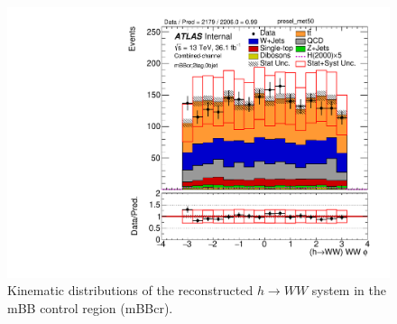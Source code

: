 \begin{figure}[!h]
\begin{center}
\includegraphics[scale=0.33]{./figures/boosted/PlotsInMbbCR/DataMC_2tag_0bjet_mbbcr_lepton_presel_met50_WWPhi}
\caption{Kinematic distributions of the reconstructed $h \to WW$ system in the mBB control region (mBBcr).}
\label{fig:boosted_mbbcr_wwsystem}
\end{center}
\end{figure}
 
